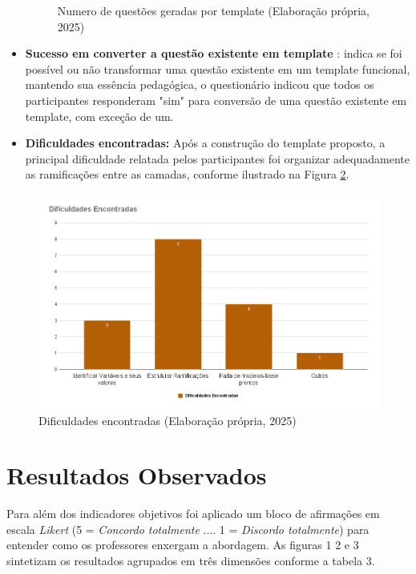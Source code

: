 \begin{itemize}
\begin{figure}[ht]
	\caption{Numero de questões geradas por template (Elaboração própria, 2025) }
	\label{fig:questoes-geradas}
\end{figure}
        \item  \textbf{Sucesso em converter a questão existente em template }: indica se foi possível ou não transformar uma questão existente em um template funcional, mantendo sua essência pedagógica, o questionário indicou que todos os participantes responderam "sim" para conversão de uma questão existente em template, com exceção de um. 
        \item \textbf{Dificuldades encontradas:} Após a construção do template proposto, a principal dificuldade relatada pelos participantes foi organizar adequadamente as ramificações entre as camadas, conforme ilustrado na Figura \ref{fig:dificuldades-encontradas}.  
    \end{itemize}


\begin{figure}[ht]
	\centering
	\includegraphics[width=16cm]{./imagens/capitulo8/dificuldades-encontradas}
	\caption{Dificuldades encontradas  (Elaboração própria, 2025) }
	\label{fig:dificuldades-encontradas}
\end{figure}



\section{Resultados Observados}

Para além dos indicadores objetivos foi aplicado um bloco de afirmações em escala \textit{Likert} (5 = \textit{Concordo totalmente} .... 1 = \textit{Discordo totalmente})  para entender como os professores enxergam a abordagem. As figuras 1 2 e 3 sintetizam os resultados agrupados em três dimensões conforme a tabela 3. 


